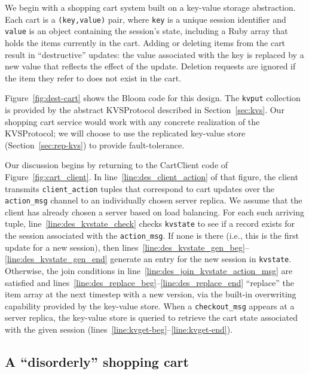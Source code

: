 We begin with a shopping cart system built on a key-value storage abstraction.
Each cart is a \texttt{(key,value)} pair, where \texttt{key} is a unique session
identifier and \texttt{value} is an object containing the session's state,
including a Ruby array that holds the items currently in the cart. Adding or deleting
items from the cart result in ``destructive'' updates: the value associated with
the key is replaced by a new value that reflects the effect of the
update. Deletion requests are ignored if the item they refer to does not exist
in the cart.

Figure~\ref{fig:dest-cart} shows the Bloom code for this design. The
\texttt{kvput} collection is provided by the abstract KVSProtocol described in
Section~\ref{sec:kvs}. Our shopping cart service would work with any concrete
realization of the KVSProtocol; we will choose to use the replicated key-value
store (Section~\ref{sec:rep-kvs}) to provide fault-tolerance.

  Our discussion begins by
returning to the CartClient code of Figure~\ref{fig:cart_client}.  In
line~\ref{line:des_client_action} of that figure, the client transmits
\texttt{client\_action} tuples that correspond to cart updates over the
\texttt{action\_msg} channel to an individually chosen server replica.  We
assume that the client has already chosen a server based on load balancing.  For
each such arriving tuple, line~\ref{line:des_kvstate_check} checks
\texttt{kvstate} to see if a record exists for the session associated with the
\texttt{action\_msg}.  If none is there (i.e., this is the first update for a
new session), then
lines~\ref{line:des_kvstate_gen_beg}--\ref{line:des_kvstate_gen_end} generate an
entry for the new session in \texttt{kvstate}.  Otherwise, the join conditions
in line~\ref{line:des_join_kvstate_action_msg} are satisfied and
lines~\ref{line:des_replace_beg}--\ref{line:des_replace_end} ``replace'' the
item array at the next timestep with a new version, via the built-in overwriting
capability provided by the key-value store.  When a \texttt{checkout\_msg}
appears at a server replica, the key-value store is queried to retrieve the cart
state associated with the given session
(lines~\ref{line:kvget-beg}--\ref{line:kvget-end}).


\subsection{A ``disorderly'' shopping cart}

